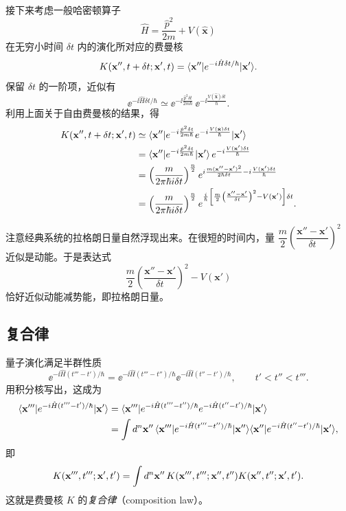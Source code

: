 接下来考虑一般哈密顿算子
\[
\hat H=\frac{\hat p^2}{2m}+V(\hat{\mathbf{x}})
\]
在无穷小时间 $\delta t$ 内的演化所对应的费曼核
\[
K(\mathbf{x}'',t+\delta t;\mathbf{x}',t)
=\langle \mathbf{x}''|e^{-i\hat H\delta t/\hbar}|\mathbf{x}'\rangle.
\]
保留 $\delta t$ 的一阶项，近似有
\[
\ee^{-\ii\hat H\delta t/\hbar}
\simeq\ee^{-\ii\frac{\hat p^2\delta t}{2m\hbar}}\,
\ee^{-\ii\frac{V(\hat{\mathbf{x}})\delta t}{\hbar}}.
\]
利用上面关于自由费曼核的结果，得
\[
\begin{aligned}
K(\mathbf{x}'',t+\delta t;\mathbf{x}',t)
&\simeq\langle \mathbf{x}''|e^{-i\frac{\hat p^2\delta t}{2m\hbar}}
e^{-i\frac{V(\hat{\mathbf{x}})\delta t}{\hbar}}|\mathbf{x}'\rangle\\
&=\langle \mathbf{x}''|e^{-i\frac{\hat p^2\delta t}{2m\hbar}}|\mathbf{x}'\rangle\,
e^{-i\frac{V(\mathbf{x}')\delta t}{\hbar}}\\
&=\left(\frac{m}{2\pi\hbar i\delta t}\right)^{\frac n2}
e^{i\frac{m(\mathbf{x}''-\mathbf{x}')^2}{2\hbar\delta t}
-i\frac{V(\mathbf{x}')\delta t}{\hbar}}\\
&=\left(\frac{m}{2\pi\hbar i\delta t}\right)^{\frac n2}
e^{\frac{i}{\hbar}\left[\frac m2\left(\frac{\mathbf{x}''-\mathbf{x}'}{\delta t}\right)^2
-V(\mathbf{x}')\right]\delta t}.
\end{aligned}
\]

注意经典系统的拉格朗日量自然浮现出来。在很短的时间内，量 $\dfrac m2\left(\dfrac{\mathbf{x}''-\mathbf{x}'}{\delta t}\right)^2$ 近似是动能。于是表达式
\[
\frac m2\left(\frac{\mathbf{x}''-\mathbf{x}'}{\delta t}\right)^2-V(\mathbf{x}')
\]
恰好近似动能减势能，即拉格朗日量。

\subsection{复合律}

量子演化满足半群性质
\[
\ee^{-\ii\hat H(t'''-t')/\hbar}
=\ee^{-\ii\hat H(t'''-t'')/\hbar}\ee^{-\ii\hat H(t''-t')/\hbar},
\qquad t'<t''<t'''.
\]
用积分核写出，这成为
\[
\begin{aligned}
\langle \mathbf{x}'''|e^{-i\hat H(t'''-t')/\hbar}|\mathbf{x}'\rangle
&=\langle \mathbf{x}'''|e^{-i\hat H(t'''-t'')/\hbar}
e^{-i\hat H(t''-t')/\hbar}|\mathbf{x}'\rangle\\
&=\int d^n\mathbf{x}''\,
\langle \mathbf{x}'''|e^{-i\hat H(t'''-t'')/\hbar}|\mathbf{x}''\rangle
\langle \mathbf{x}''|e^{-i\hat H(t''-t')/\hbar}|\mathbf{x}'\rangle,
\end{aligned}
\]
即
\[
K(\mathbf{x}''',t''';\mathbf{x}',t')
=\int d^n\mathbf{x}''\,
K(\mathbf{x}''',t''';\mathbf{x}'',t'')K(\mathbf{x}'',t'';\mathbf{x}',t').
\]
这就是费曼核 $K$ 的\emph{复合律}（composition law）。

